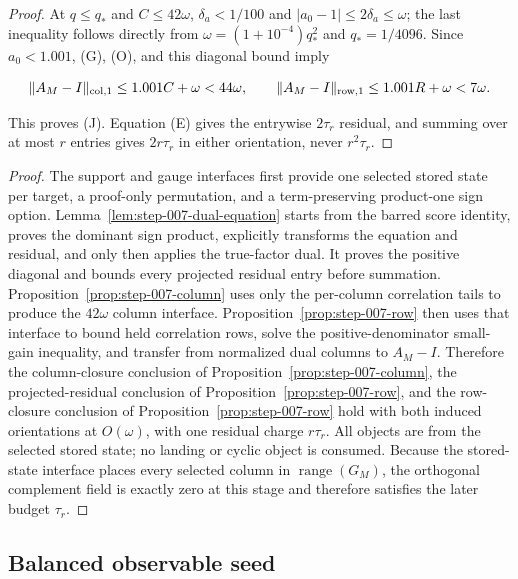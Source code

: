 \begin{proposition}
\begin{proof}
At $q\le q_*$ and $C\le42\omega$, $\delta_a<1/100$ and
$|a_0-1|\le2\delta_a\le\omega$; the last inequality follows directly from
$\omega=(1+10^{-4})q_*^2$ and $q_*=1/4096$.
Since $a_0<1.001$, (G), (O), and this diagonal bound imply

\[
\|A_M-I\|_{\rm col,1}\le1.001C+\omega<44\omega,\qquad
\|A_M-I\|_{\rm row,1}\le1.001R+\omega<7\omega.
\]

This proves (J). Equation (E) gives the entrywise $2\tau_r$ residual, and
summing over at most $r$ entries gives $2r\tau_r$ in either orientation,
never $r^2\tau_r$.

\end{proof}
\end{proposition}
\begin{proof}
The support and gauge interfaces first provide one selected
stored state per target, a proof-only permutation, and a term-preserving
product-one sign option.  Lemma~\ref{lem:step-007-dual-equation} starts from the
barred score identity, proves the dominant sign product, explicitly
transforms the equation and residual, and only then applies the true-factor
dual.  It proves the positive diagonal and bounds every projected residual
entry before summation.  Proposition~\ref{prop:step-007-column} uses
only the per-column correlation tails to produce the $42\omega$
column interface.  Proposition~\ref{prop:step-007-row} then uses that interface
to bound held correlation rows, solve the positive-denominator small-gain
inequality, and transfer from normalized dual columns to $A_M-I$. Therefore
the column-closure conclusion of Proposition~\ref{prop:step-007-column}, the projected-residual conclusion of Proposition~\ref{prop:step-007-row}, and the row-closure conclusion of Proposition~\ref{prop:step-007-row} hold with both induced orientations at
$O(\omega)$, with one residual charge $r\tau_r$. All objects are from the
selected stored state; no landing or cyclic object is consumed.
Because the stored-state interface places every selected column in
$\operatorname{range}(G_M)$, the orthogonal complement field is exactly zero
at this stage and therefore satisfies the later budget $\tau_r$.
\end{proof}

\subsection{Balanced observable seed}\label{app:step-008}

